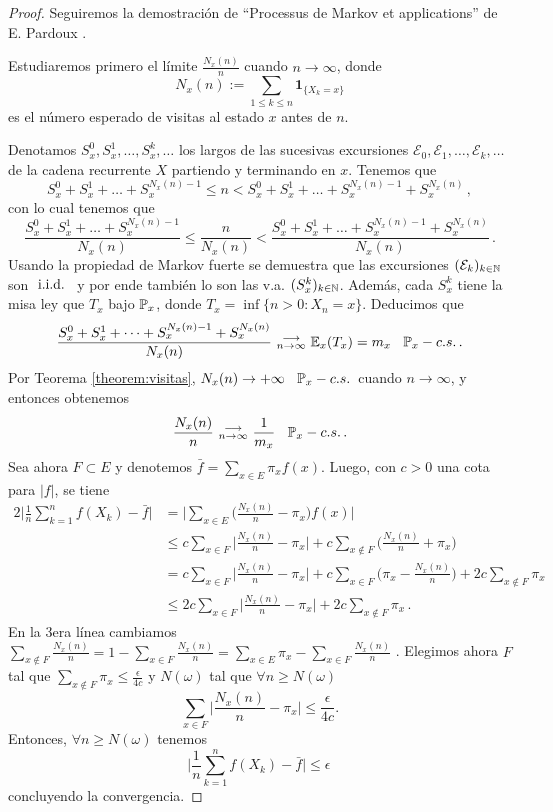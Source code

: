 \begin{proof}
\gris Seguiremos la demostración de ``Processus de Markov et applications'' %
de E. Pardoux \cite{pardoux}.

Estudiaremos primero el límite $\displaystyle\frac{N_x(n)}{n}$ cuando $n\to\infty$, donde
$$ N_x(n):=\displaystyle\sum_{1\leq k\leq n}\mathbf{1}_{\{X_k=x\}}$$
es el número esperado de visitas al estado $x$ antes de $n$.

Denotamos $S^0_x,S^1_x,\dots,S^k_x,\dots$ los largos de las sucesivas excursiones $\mathcal{E}_0,\mathcal{E}_1,\dots,\mathcal{E}_k,\dots$ de la cadena recurrente $X$  partiendo y terminando en $x$. Tenemos que
$$ S^0_x+S^1_x+\dots+S^{N_x(n)-1}_x \leq n < S^0_x+S^1_x+\dots+S^{N_x(n)-1}_x+S^{N_x(n)}_x \, ,$$
con lo cual tenemos que
$$ \displaystyle \frac{S^0_x+S^1_x+\dots+S^{N_x(n)-1}_x}{N_x(n)} \leq \frac{n}{N_x(n)} < \frac{S^0_x+S^1_x+\dots+S^{N_x(n)-1}_x+S^{N_x(n)}_x}{N_x(n)} \,. $$
Usando la propiedad de Markov fuerte se demuestra que las excursiones $(\mathcal{E}_k)_{k\in\N}$ son $\iid$ y por ende también lo son las v.a.  $(S_x^k)_{k\in\N}$. Adem\'as, cada $S_x^k$ tiene la misa ley que $T_x$ bajo $\P_x$, donde $T_x = \inf\{n > 0: X_n = x\}$. Deducimos que 
$$ \frac{S^0_x+S^1_x+\dots+S^{N_x(n)-1}_x+S^{N_x(n)}_x}{N_x(n)} \conv \E_x(T_x)=m_x \espacio \P_x-c.s. \, .$$
Por Teorema \ref{theorem:visitas}, $N_x(n)\to + \infty \espacio \P_x-c.s. \,$ cuando $n\to \infty$, y entonces obtenemos
$$ \displaystyle \frac{N_x(n)}{n}\conv \frac{1}{m_x} \espacio \P_x-c.s. \,.$$
Sea ahora $F\subset E$ y denotemos $\bar f = \displaystyle \sum_{x\in E}\pi_x f(x)$. Luego, con $c>0$ una cota para $|f|$, se tiene
\begin{alignat*}{2}
\bigg| \frac{1}{n}\sum^n_{k=1}f(X_k)-\bar f\bigg| & = \bigg|\sum_{x\in E}\bigg( \frac{N_x(n)}{n}-\pi_x \bigg)f(x)\bigg|\\
& \leq c\sum_{x\in F}\bigg|\frac{N_x(n)}{n}-\pi_x\bigg|+c\sum_{x\notin F}\bigg(\frac{N_x(n)}{n}+\pi_x\bigg) \\
& = c\sum_{x\in F}\bigg|\frac{N_x(n)}{n}-\pi_x\bigg|+c\sum_{x\in F}\bigg(\pi_x-\frac{N_x(n)}{n}\bigg)+2c\sum_{x\notin F}\pi_x \\
& \leq 2c\sum_{x\in F}\bigg|\frac{N_x(n)}{n}-\pi_x \bigg|+2c\sum_{x\notin F}\pi_x \, .
\end{alignat*}
En la 3era l\'inea cambiamos $\sum_{x\notin F} \frac{N_x(n)}{n} = 1 - \sum_{x\in F}  \frac{N_x(n)}{n} = \sum_{x\in E}  \pi_x - \sum_{x\in F}  \frac{N_x(n)}{n}  $ . Elegimos ahora $F$ tal que $\displaystyle \sum_{x\notin F}\pi_x\leq\frac{\epsilon}{4c}$ y $N(\omega)$ tal que $\forall n\geq N(\omega)$ 
$$ \sum_{x\in F}\bigg|\frac{N_x(n)}{n}-\pi_x\bigg|\leq\frac{\epsilon}{4c}. $$
Entonces, $\forall n\geq N(\omega)$ tenemos $$ \bigg| \frac{1}{n}\sum^n_{k=1}f(X_k)-\bar f\bigg|\leq\epsilon \, $$
concluyendo  la convergencia. \findem
\negro
\end{proof}
